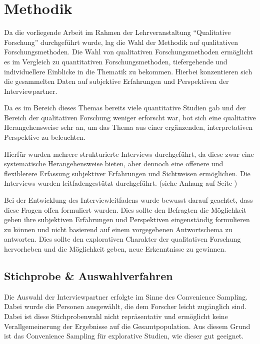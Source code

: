 \section{Methodik}
Da die vorliegende Arbeit im Rahmen der Lehrveranstaltung \enquote{Qualitative Forschung} durchgeführt wurde, lag die Wahl der Methodik auf qualitativen Forschungsmethoden. Die Wahl von qualitativen Forschungsmethoden ermöglicht es im Vergleich zu quantitativen Forschungsmethoden, tiefergehende und individuellere Einblicke in die Thematik zu bekommen. Hierbei konzentieren sich die gesammelten Daten auf subjektive Erfahrungen und Perspektiven der Interviewpartner.

Da es im Bereich dieses Themas bereits viele quantitative Studien gab und der Bereich der qualitativen Forschung weniger erforscht war, bot sich eine qualitative Herangehensweise sehr an, um das Thema aus einer ergänzenden, interpretativen Perspektive zu beleuchten. 

Hierfür wurden mehrere strukturierte Interviews durchgeführt, da diese zwar eine systematische Herangehensweise bieten, aber dennoch eine offenere und flexiblerere Erfassung subjektiver Erfahrungen und Sichtweisen ermöglichen. Die Interviews wurden leitfadengestützt durchgeführt. (siehe Anhang auf Seite \pageref{app:leitfaden})

Bei der Entwicklung des Interviewleitfadens wurde bewusst darauf geachtet, dass diese Fragen offen formuliert wurden. Dies sollte den Befragten die Möglichkeit geben ihre subjektiven Erfahrungen und Perspektiven eingenständig formulieren zu können und nicht basierend auf einem vorgegebenen Antwortschema zu antworten. Dies sollte den explorativen Charakter der qualitativen Forschung hervorheben und die Möglichkeit geben, neue Erkenntnisse zu gewinnen.

\subsection{Stichprobe \& Auswahlverfahren}
Die Auswahl der Interviewpartner erfolgte im Sinne des Convenience Sampling. Dabei wurde die Personen ausgewählt, die dem Forscher leicht zugänglich sind. Dabei ist diese Stichprobenwahl nicht repräsentativ und ermöglicht keine Verallgemeinerung der Ergebnisse auf die Gesamtpopulation. Aus diesem Grund ist das Convenience Sampling für explorative Studien, wie dieser gut geeignet.


